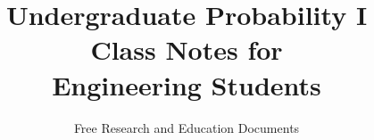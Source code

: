 \documentclass[12pt,openany]{book}
\begin{document}
\author{Free Research and Education Documents}
\title{
\Huge{Undergraduate Probability I}\\[5mm]
\Large{Class Notes for\\Engineering Students}}

\frontmatter
\maketitle



\tableofcontents

\frontmatter
%

\mainmatter

















%

%

\printindex
\end{document}

